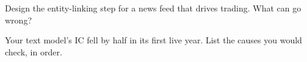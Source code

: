 \begin{interviewq}\label{iq:ml:text-from-bag-of-words-to-embeddings:5}
Design the entity-linking step for a news feed that drives trading. What can go wrong?
\end{interviewq}

\begin{interviewq}\label{iq:ml:text-from-bag-of-words-to-embeddings:6}
Your text model's IC fell by half in its first live year. List the causes you would check, in order.
\end{interviewq}
